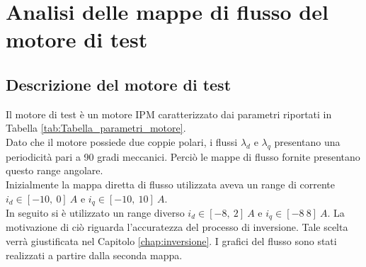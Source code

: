\chapter{Analisi delle mappe di flusso del motore di test}
\raggedbottom
\section{Descrizione del motore di test}
Il motore di test è un motore IPM caratterizzato dai parametri riportati in Tabella \ref{tab:Tabella_parametri_motore}.\\
Dato che il motore possiede due coppie polari, i flussi $\lambda_d$ e $\lambda_q$ presentano una periodicità pari a 90 gradi meccanici. Perciò le mappe di flusso fornite presentano questo range angolare.\\
Inizialmente la mappa diretta di flusso utilizzata aveva un range di corrente $i_d \in [-10,\ 0] \ A$ e $i_q \in [-10,\ 10] \ A$.\\
In seguito si è utilizzato un range diverso $i_d \in [-8,\ 2] \ A$ e $i_q \in [-8 \ 8] \ A$. La motivazione di ciò riguarda l'accuratezza del processo di inversione. Tale scelta verrà giustificata nel Capitolo \ref{chap:inversione}. I grafici del flusso sono stati realizzati a partire dalla seconda mappa.

